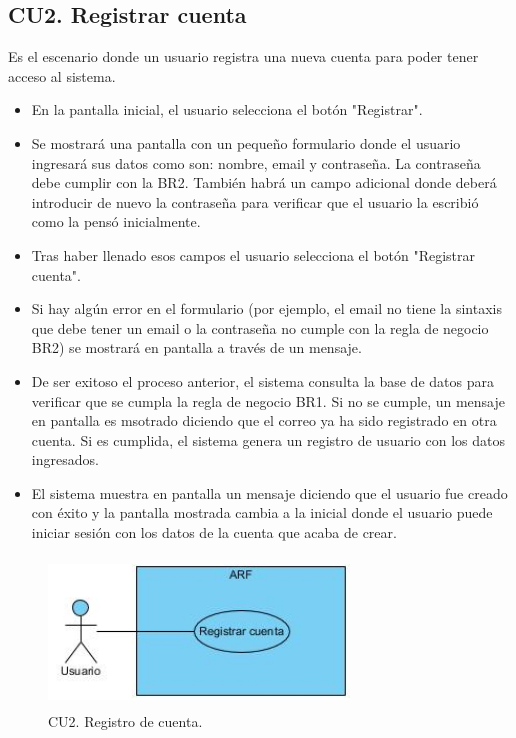 \subsection{CU2. Registrar cuenta} \par
Es el escenario donde un usuario registra una nueva cuenta para poder tener acceso al sistema.
\begin{itemize}
	\item En la pantalla inicial, el usuario selecciona el botón "Registrar".
	\item Se mostrará una pantalla con un pequeño formulario donde el usuario ingresará sus datos como son: nombre, email y contraseña. La contraseña debe cumplir con la BR2. También habrá un campo adicional donde deberá introducir de nuevo la contraseña para verificar que el usuario la escribió como la pensó inicialmente.
	\item Tras haber llenado esos campos el usuario selecciona el botón "Registrar cuenta".
	\item Si hay algún error en el formulario (por ejemplo, el email no tiene la sintaxis que debe tener un email o la contraseña no cumple con la regla de negocio BR2) se mostrará en pantalla a través de un mensaje.
	\item De ser exitoso el proceso anterior, el sistema consulta la base de datos para verificar que se cumpla la regla de negocio BR1. Si no se cumple, un mensaje en pantalla es msotrado diciendo que el correo ya ha sido registrado en otra cuenta. Si es cumplida, el sistema genera un registro de usuario con los datos ingresados.
	\item El sistema muestra en pantalla un mensaje diciendo que el usuario fue creado con éxito y la pantalla mostrada cambia a la inicial donde el usuario puede iniciar sesión con los datos de la cuenta que acaba de crear.
\end{itemize}

\begin{figure}[h!]
	\centering
	\includegraphics[width=8cm,height=4cm]{imagenes/analisis/cu/registrar_cuenta.jpg}
	\caption{CU2. Registro de cuenta.}
	\label{fig:registrarcuenta}
\end{figure} 

